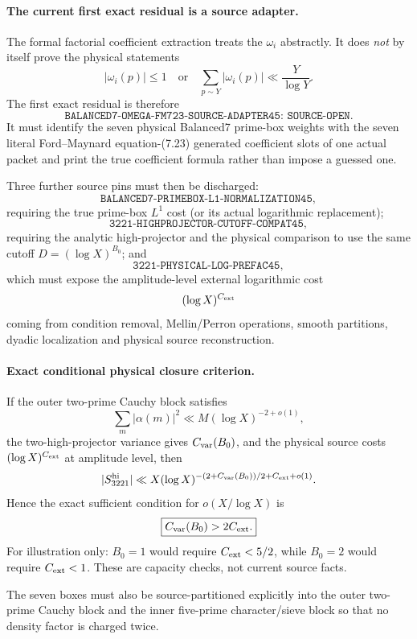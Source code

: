 \documentclass[11pt]{article}
\theoremstyle{definition}
\newcommand{\1}{\mathbf 1}
\begin{document}
\paragraph{The current first exact residual is a source adapter.}
The formal factorial coefficient extraction treats the $\omega_i$ abstractly.  It does
\emph{not} by itself prove the physical statements
\[
|\omega_i(p)|\le1
\quad\text{or}\quad
\sum_{p\sim Y}|\omega_i(p)|\ll\frac{Y}{\log Y}.
\]
The first exact residual is therefore
\[
\boxed{\texttt{BALANCED7-OMEGA-FM723-SOURCE-ADAPTER45: SOURCE-OPEN}.}
\]
It must identify the seven physical Balanced7 prime-box weights with the seven literal
Ford--Maynard equation-(7.23) generated coefficient slots of one actual packet and print
the true coefficient formula rather than impose a guessed one.

Three further source pins must then be discharged:
\[
\boxed{\texttt{BALANCED7-PRIMEBOX-L1-NORMALIZATION45}},
\]
requiring the true prime-box $L^1$ cost (or its actual logarithmic replacement);
\[
\boxed{\texttt{3221-HIGHPROJECTOR-CUTOFF-COMPAT45}},
\]
requiring the analytic high-projector and the physical comparison to use the same cutoff
$D=(\log X)^{B_0}$; and
\[
\boxed{\texttt{3221-PHYSICAL-LOG-PREFAC45}},
\]
which must expose the amplitude-level external logarithmic cost
\[
(\log X)^{C_{\rm ext}}
\]
coming from condition removal, Mellin/Perron operations, smooth partitions, dyadic
localization and physical source reconstruction.

\paragraph{Exact conditional physical closure criterion.}
If the outer two-prime Cauchy block satisfies
\[
\sum_m|\alpha(m)|^2
\ll
M(\log X)^{-2+o(1)},
\]
the two-high-projector variance gives $C_{\rm var}(B_0)$, and the physical source costs
$(\log X)^{C_{\rm ext}}$ at amplitude level, then
\[
|S_{3221}^{\rm hi}|
\ll
X(\log X)^{-(2+C_{\rm var}(B_0))/2+C_{\rm ext}+o(1)}.
\]
Hence the exact sufficient condition for $o(X/\log X)$ is
\[
\boxed{C_{\rm var}(B_0)>2C_{\rm ext}.}
\]
For illustration only: $B_0=1$ would require $C_{\rm ext}<5/2$, while $B_0=2$ would require
$C_{\rm ext}<1$.  These are capacity checks, not current source facts.

The seven boxes must also be source-partitioned explicitly into the outer two-prime Cauchy
block and the inner five-prime character/sieve block so that no density factor is charged
twice.
\end{document}

